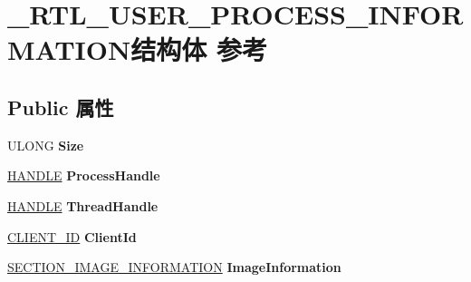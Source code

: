 \hypertarget{struct___r_t_l___u_s_e_r___p_r_o_c_e_s_s___i_n_f_o_r_m_a_t_i_o_n}{}\section{\+\_\+\+R\+T\+L\+\_\+\+U\+S\+E\+R\+\_\+\+P\+R\+O\+C\+E\+S\+S\+\_\+\+I\+N\+F\+O\+R\+M\+A\+T\+I\+O\+N结构体 参考}
\label{struct___r_t_l___u_s_e_r___p_r_o_c_e_s_s___i_n_f_o_r_m_a_t_i_o_n}
\subsection*{Public 属性}
\begin{DoxyCompactItemize}
\item 
\mbox{\label{struct___r_t_l___u_s_e_r___p_r_o_c_e_s_s___i_n_f_o_r_m_a_t_i_o_n_a427ccae3e7c94320037356fc5ae2972e}} 
U\+L\+O\+NG {\bfseries Size}
\item 
\mbox{\label{struct___r_t_l___u_s_e_r___p_r_o_c_e_s_s___i_n_f_o_r_m_a_t_i_o_n_ac998a07171045873bc93b9c6ca4f3bbe}} 
\hyperlink{interfacevoid}{H\+A\+N\+D\+LE} {\bfseries Process\+Handle}
\item 
\mbox{\label{struct___r_t_l___u_s_e_r___p_r_o_c_e_s_s___i_n_f_o_r_m_a_t_i_o_n_ac9c701e46262450e9623fdff8a468e89}} 
\hyperlink{interfacevoid}{H\+A\+N\+D\+LE} {\bfseries Thread\+Handle}
\item 
\mbox{\label{struct___r_t_l___u_s_e_r___p_r_o_c_e_s_s___i_n_f_o_r_m_a_t_i_o_n_a18ed29d48493dbf75ff391508d8570ad}} 
\hyperlink{struct___c_l_i_e_n_t___i_d}{C\+L\+I\+E\+N\+T\+\_\+\+ID} {\bfseries Client\+Id}
\item 
\mbox{\label{struct___r_t_l___u_s_e_r___p_r_o_c_e_s_s___i_n_f_o_r_m_a_t_i_o_n_a43b28d482742d4ae2770a155d628d2bd}} 
\hyperlink{struct___s_e_c_t_i_o_n___i_m_a_g_e___i_n_f_o_r_m_a_t_i_o_n}{S\+E\+C\+T\+I\+O\+N\+\_\+\+I\+M\+A\+G\+E\+\_\+\+I\+N\+F\+O\+R\+M\+A\+T\+I\+ON} {\bfseries Image\+Information}

\end{DoxyCompactItemize}
